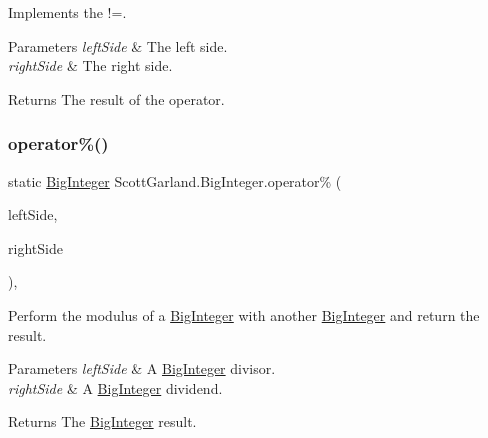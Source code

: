 Implements the !=. 


\begin{DoxyParams}{Parameters}
{\em left\+Side} & The left side.\\
\hline
{\em right\+Side} & The right side.\\
\hline
\end{DoxyParams}
\begin{DoxyReturn}{Returns}
The result of the operator.
\end{DoxyReturn}
\mbox{\label{class_scott_garland_1_1_big_integer_a6660cf490e242eed91928fca289e7b7f}} 
\subsubsection{\texorpdfstring{operator\%()}{operator\%()}}
{\footnotesize\ttfamily static \hyperlink{class_scott_garland_1_1_big_integer}{Big\+Integer} Scott\+Garland.\+Big\+Integer.\+operator\% (\begin{DoxyParamCaption}\item[{\hyperlink{class_scott_garland_1_1_big_integer}{Big\+Integer}}]{left\+Side,  }\item[{\hyperlink{class_scott_garland_1_1_big_integer}{Big\+Integer}}]{right\+Side }\end{DoxyParamCaption})\hspace{0.3cm}{\ttfamily [inline]}, {\ttfamily [static]}}



Perform the modulus of a \hyperlink{class_scott_garland_1_1_big_integer}{Big\+Integer} with another \hyperlink{class_scott_garland_1_1_big_integer}{Big\+Integer} and return the result. 


\begin{DoxyParams}{Parameters}
{\em left\+Side} & A \hyperlink{class_scott_garland_1_1_big_integer}{Big\+Integer} divisor.\\
\hline
{\em right\+Side} & A \hyperlink{class_scott_garland_1_1_big_integer}{Big\+Integer} dividend.\\
\hline
\end{DoxyParams}
\begin{DoxyReturn}{Returns}
The \hyperlink{class_scott_garland_1_1_big_integer}{Big\+Integer} result.
\end{DoxyReturn}
\mbox{\label{class_scott_garland_1_1_big_integer_a41718b5e26902e535502174c88229302}} 
